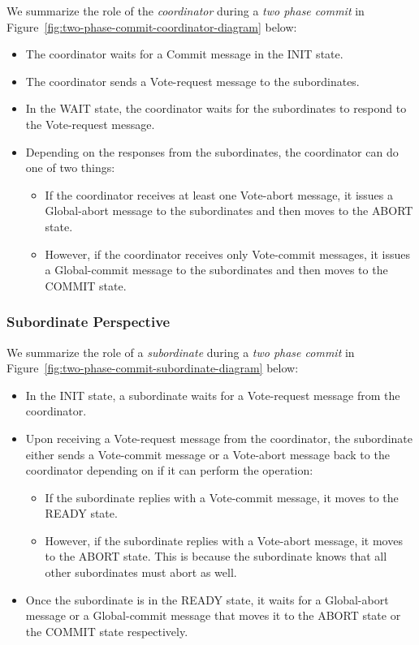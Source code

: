 \documentclass[twoside]{article}
\begin{document}
We summarize the role of the \emph{coordinator} during a \emph{two phase commit} in Figure~\ref{fig:two-phase-commit-coordinator-diagram} below:
\begin{itemize}
    \item The coordinator waits for a {\ttfamily Commit} message in the {\ttfamily INIT} state. 
    \item The coordinator sends a {\ttfamily Vote-request} message to the subordinates. 
    \item In the {\ttfamily WAIT} state, the coordinator waits for the subordinates to respond to the {\ttfamily Vote-request} message.
    \item Depending on the responses from the subordinates, the coordinator can do one of two things:
        \begin{itemize}
            \item If the coordinator receives at least one {\ttfamily Vote-abort} message, it issues a {\ttfamily Global-abort} message to the subordinates and then moves to the {\ttfamily ABORT} state.
            \item However, if the coordinator receives only {\ttfamily Vote-commit} messages, it issues a {\ttfamily Global-commit} message to the subordinates and then moves to the {\ttfamily COMMIT} state.
        \end{itemize} 
\end{itemize}

\subsubsection{Subordinate Perspective}

We summarize the role of a \emph{subordinate} during a \emph{two phase commit} in Figure~\ref{fig:two-phase-commit-subordinate-diagram} below:
\begin{itemize}
    \item In the {\ttfamily INIT} state, a subordinate waits for a {\ttfamily Vote-request} message from the coordinator.
    \item Upon receiving a {\ttfamily Vote-request} message from the coordinator, the subordinate either sends a {\ttfamily Vote-commit} message or a {\ttfamily Vote-abort} message back to the coordinator depending on if it can perform the operation:
        \begin{itemize}
            \item If the subordinate replies with a {\ttfamily Vote-commit} message, it moves to the {\ttfamily READY} state.
            \item However, if the subordinate replies with a {\ttfamily Vote-abort} message, it moves to the {\ttfamily ABORT} state. This is because the subordinate knows that all other subordinates must abort as well.
        \end{itemize}
    \item Once the subordinate is in the {\ttfamily READY} state, it waits for a {\ttfamily Global-abort} message or a {\ttfamily Global-commit} message that moves it to the {\ttfamily ABORT} state or the {\ttfamily COMMIT} state respectively. 
\end{itemize}
\end{document}
